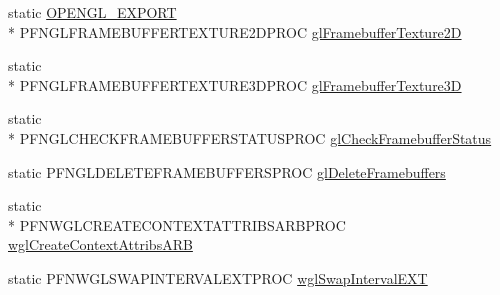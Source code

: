 \begin{DoxyCompactItemize}
\item 
static \hyperlink{_config_8h_a77401aa3bc0a379879047c1bd30f262e}{O\+P\+E\+N\+G\+L\+\_\+\+E\+X\+P\+O\+R\+T} \\*
P\+F\+N\+G\+L\+F\+R\+A\+M\+E\+B\+U\+F\+F\+E\+R\+T\+E\+X\+T\+U\+R\+E2\+D\+P\+R\+O\+C \hyperlink{class_agmd_1_1_g_l_driver_a6177cc8fd4c96c33163b38ac69b4a0ff}{gl\+Framebuffer\+Texture2\+D}
\item 
static \\*
P\+F\+N\+G\+L\+F\+R\+A\+M\+E\+B\+U\+F\+F\+E\+R\+T\+E\+X\+T\+U\+R\+E3\+D\+P\+R\+O\+C \hyperlink{class_agmd_1_1_g_l_driver_aa12f161d66a6a1e78313040435b0e7ff}{gl\+Framebuffer\+Texture3\+D}
\item 
static \\*
P\+F\+N\+G\+L\+C\+H\+E\+C\+K\+F\+R\+A\+M\+E\+B\+U\+F\+F\+E\+R\+S\+T\+A\+T\+U\+S\+P\+R\+O\+C \hyperlink{class_agmd_1_1_g_l_driver_a740b479fc5509641ccd4fa4aba946f8b}{gl\+Check\+Framebuffer\+Status}
\item 
static P\+F\+N\+G\+L\+D\+E\+L\+E\+T\+E\+F\+R\+A\+M\+E\+B\+U\+F\+F\+E\+R\+S\+P\+R\+O\+C \hyperlink{class_agmd_1_1_g_l_driver_a83b92608a37aabf994ad28e62c2cc45a}{gl\+Delete\+Framebuffers}
\item 
static \\*
P\+F\+N\+W\+G\+L\+C\+R\+E\+A\+T\+E\+C\+O\+N\+T\+E\+X\+T\+A\+T\+T\+R\+I\+B\+S\+A\+R\+B\+P\+R\+O\+C \hyperlink{class_agmd_1_1_g_l_driver_abd56505ddf55fe13d396534d0ae77baa}{wgl\+Create\+Context\+Attribs\+A\+R\+B}
\item 
static P\+F\+N\+W\+G\+L\+S\+W\+A\+P\+I\+N\+T\+E\+R\+V\+A\+L\+E\+X\+T\+P\+R\+O\+C \hyperlink{class_agmd_1_1_g_l_driver_ae8375296a8a17c17f8292cab6dacc2fb}{wgl\+Swap\+Interval\+E\+X\+T}
\end{DoxyCompactItemize}
